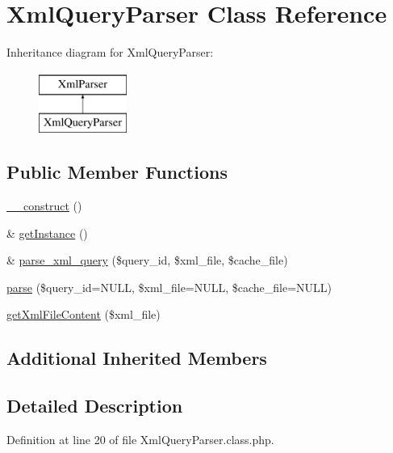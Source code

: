 \hypertarget{classXmlQueryParser}{\section{Xml\-Query\-Parser Class Reference}
\label{classXmlQueryParser}
}
Inheritance diagram for Xml\-Query\-Parser\-:\begin{figure}[H]
\begin{center}
\leavevmode
\includegraphics[height=2.000000cm]{classXmlQueryParser}
\end{center}
\end{figure}
\subsection*{Public Member Functions}
\begin{DoxyCompactItemize}
\item 
\hyperlink{classXmlQueryParser_a7203a5af8c65f98f5fad562ebfb34f99}{\-\_\-\-\_\-construct} ()
\item 
\& \hyperlink{classXmlQueryParser_af6558a14a48242f4082d4b05e24b66be}{get\-Instance} ()
\item 
\& \hyperlink{classXmlQueryParser_ada0b24aac541d493f8344a74776664cb}{parse\-\_\-xml\-\_\-query} (\$query\-\_\-id, \$xml\-\_\-file, \$cache\-\_\-file)
\item 
\hyperlink{classXmlQueryParser_a73bf00a88a856f3acb99dba3f554aeb2}{parse} (\$query\-\_\-id=N\-U\-L\-L, \$xml\-\_\-file=N\-U\-L\-L, \$cache\-\_\-file=N\-U\-L\-L)
\item 
\hyperlink{classXmlQueryParser_aed43fc81b117c0d90948cb70cdad6280}{get\-Xml\-File\-Content} (\$xml\-\_\-file)
\end{DoxyCompactItemize}
\subsection*{Additional Inherited Members}


\subsection{Detailed Description}


Definition at line 20 of file Xml\-Query\-Parser.\-class.\-php.



